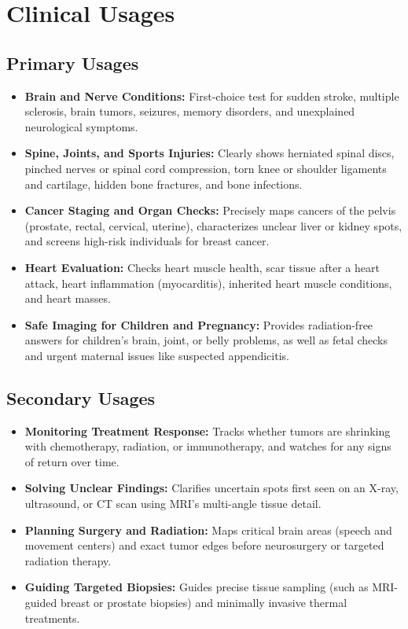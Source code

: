 \section{Clinical Usages}

\subsection{Primary Usages}
\begin{itemize}
\item \textbf{Brain and Nerve Conditions:} First-choice test for sudden stroke, multiple sclerosis, brain tumors, seizures, memory disorders, and unexplained neurological symptoms.
\item \textbf{Spine, Joints, and Sports Injuries:} Clearly shows herniated spinal discs, pinched nerves or spinal cord compression, torn knee or shoulder ligaments and cartilage, hidden bone fractures, and bone infections.
\item \textbf{Cancer Staging and Organ Checks:} Precisely maps cancers of the pelvis (prostate, rectal, cervical, uterine), characterizes unclear liver or kidney spots, and screens high-risk individuals for breast cancer.
\item \textbf{Heart Evaluation:} Checks heart muscle health, scar tissue after a heart attack, heart inflammation (myocarditis), inherited heart muscle conditions, and heart masses.
\item \textbf{Safe Imaging for Children and Pregnancy:} Provides radiation-free answers for children's brain, joint, or belly problems, as well as fetal checks and urgent maternal issues like suspected appendicitis.
\end{itemize}

\subsection{Secondary Usages}
\begin{itemize}
\item \textbf{Monitoring Treatment Response:} Tracks whether tumors are shrinking with chemotherapy, radiation, or immunotherapy, and watches for any signs of return over time.
\item \textbf{Solving Unclear Findings:} Clarifies uncertain spots first seen on an X-ray, ultrasound, or CT scan using MRI's multi-angle tissue detail.
\item \textbf{Planning Surgery and Radiation:} Maps critical brain areas (speech and movement centers) and exact tumor edges before neurosurgery or targeted radiation therapy.
\item \textbf{Guiding Targeted Biopsies:} Guides precise tissue sampling (such as MRI-guided breast or prostate biopsies) and minimally invasive thermal treatments.
\end{itemize}

